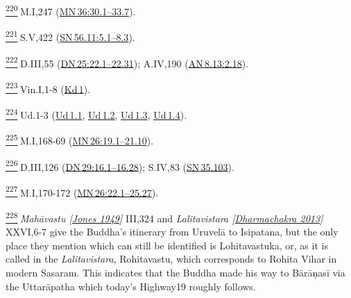 \label{footprints_split_024.html_fn220}
\hyperref[footprints_split_009.htmlux5cux23fnref220]{\textsuperscript{220}} M.I,247
(\href{https://suttacentral.net/mn36/en/sujato\#30.1}{MN\,36:30.1--33.7}).

\label{footprints_split_024.html_fn221}
\hyperref[footprints_split_009.htmlux5cux23fnref221]{\textsuperscript{221}} S.V,422
(\href{https://suttacentral.net/sn56.11/en/sujato\#5.1}{SN\,56.11:5.1--8.3}).

\label{footprints_split_024.html_fn222}
\hyperref[footprints_split_009.htmlux5cux23fnref222]{\textsuperscript{222}} D.III,55
(\href{https://suttacentral.net/dn25/en/sujato\#22.1}{DN\,25:22.1--22.31});
A.IV,190
(\href{https://suttacentral.net/an8.13/en/sujato\#2.18}{AN\,8.13:2.18}).

\label{footprints_split_024.html_fn223}
\hyperref[footprints_split_009.htmlux5cux23fnref223]{\textsuperscript{223}} Vin.I,1-8
(\href{https://suttacentral.net/pli-tv-kd1/en/brahmali}{Kd\,1}).

\label{footprints_split_024.html_fn224}
\hyperref[footprints_split_009.htmlux5cux23fnref224]{\textsuperscript{224}} Ud.1-3
(\href{https://suttacentral.net/ud1.1/en/sujato}{Ud\,1.1},
\href{https://suttacentral.net/ud1.2/en/sujato}{Ud\,1.2},
\href{https://suttacentral.net/ud1.3/en/sujato}{Ud\,1.3},
\href{https://suttacentral.net/ud1.4/en/sujato}{Ud\,1.4}).

\label{footprints_split_024.html_fn225}
\hyperref[footprints_split_009.htmlux5cux23fnref225]{\textsuperscript{225}} M.I,168-69
(\href{https://suttacentral.net/mn26/en/sujato\#19.1}{MN\,26:19.1--21.10}).

\label{footprints_split_024.html_fn226}
\hyperref[footprints_split_009.htmlux5cux23fnref226]{\textsuperscript{226}} D.III,126
(\href{https://suttacentral.net/dn29/en/sujato\#16.1}{DN\,29:16.1--16.28});
S.IV,83
(\href{https://suttacentral.net/sn35.103/en/sujato}{SN\,35.103}).

\label{footprints_split_024.html_fn227}
\hyperref[footprints_split_009.htmlux5cux23fnref227]{\textsuperscript{227}} M.I,170-172
(\href{https://suttacentral.net/mn26/en/sujato\#22.1}{MN\,26:22.1--25.27}).

\label{footprints_split_024.html_fn228}
\hyperref[footprints_split_009.htmlux5cux23fnref228]{\textsuperscript{228}} \emph{{Mahāvastu
{{[}\hyperref[footprints_split_023.htmlux5cux23Jonesux5cux25201949]{Jones
1949}{]}}}} III,324 and \emph{{Lalitavistara
{{[}\hyperref[footprints_split_023.htmlux5cux23Dharmachakraux5cux25202013]{Dharmachakra
2013}{]}}}} XXVI,6-7 give the Buddha's itinerary from Uruvelā to
Isipatana, but the only place they mention which can still be identified
is Lohitavastuka, or, as it is called in the \emph{Lalitavistara},
Rohitavastu, which corresponds to Rohita Vihar in modern Sasaram. This
indicates that the Buddha made his way to Bārāṇasī via the Uttarāpatha
which today's Highway19 roughly follows.


